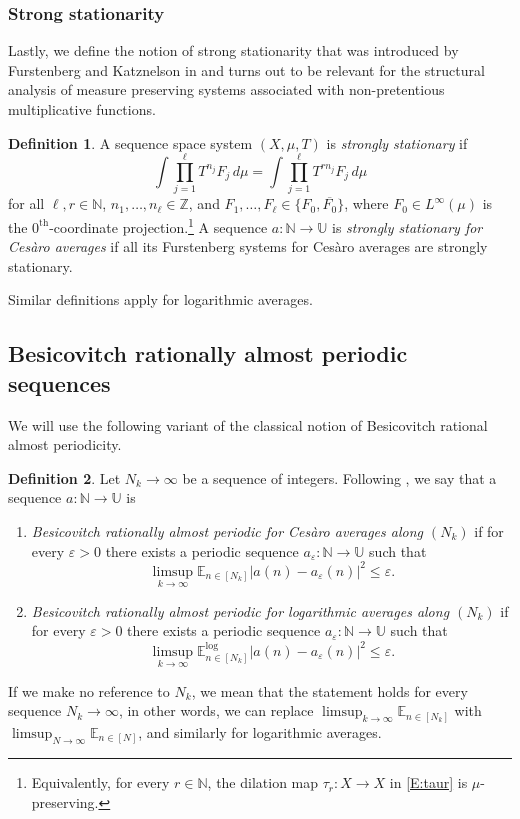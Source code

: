 \documentclass[11pt]{amsart}
\theoremstyle{definition}
\newtheorem{definition}{Definition}[section]
\newcommand{\lE}{\mathbb{E}^{\log}}
\newcommand{\E}{{\mathbb E}}
\newcommand{\N}{{\mathbb N}}
\newcommand{\Z}{{\mathbb Z}}
\newcommand{\U}{{\mathbb U}}
\begin{document}
\subsubsection{Strong stationarity}
Lastly, we define the notion of strong stationarity that was introduced by Furstenberg and Katznelson in \cite{FK91} and turns out to be relevant for  the structural analysis of measure preserving systems associated with  non-pretentious multiplicative functions. 		
\begin{definition}\label{D:sst}
	A sequence space system $(X,\mu,T)$ is {\em strongly stationary} if
	\begin{equation}\label{E:sst}
		\int \prod_{j=1}^\ell T^{n_j}F_j\, d\mu=	\int \prod_{j=1}^\ell T^{rn_j}F_j\, d\mu
	\end{equation}
	for all $\ell,r\in \N$, $n_1,\ldots, n_\ell\in \Z$,  and  $F_1,\ldots, F_\ell\in \{F_0,\overline{F_0}\}$,
	where $F_0\in L^\infty(\mu)$ is the $0^{\text{th}}$-coordinate projection.\footnote{Equivalently,    for every $r\in\N$, the dilation map $\tau_r\colon X\to X$ in \eqref{E:taur}  is $\mu$-preserving.}
	A sequence $a\colon \N\to \U$ is {\em strongly stationary for Ces\`aro averages}  if all its Furstenberg systems for Ces\`aro averages are strongly stationary.
	
	Similar definitions apply for logarithmic averages.
\end{definition}


 \subsection{Besicovitch rationally almost periodic sequences}\label{SS:Bes}
 We will use the following variant of the classical notion of Besicovitch rational almost periodicity.
 \begin{definition}\label{D:RAP}
 	Let $N_k\to \infty$ be a sequence of integers.	 Following \cite{BPLR19},	we say that a sequence $a\colon \N\to \U$ is
 	\begin{enumerate}
 		\item 	  {\em Besicovitch rationally almost periodic for Ces\`aro averages along $(N_k)$}  if for every $\varepsilon>0$ there exists a periodic sequence $a_\varepsilon\colon \N\to \U$   such that
 		$$
 		\limsup_{k\to\infty}\E_{n\in [N_k]}|a(n)-a_\varepsilon(n)|^2\leq \varepsilon.
 		$$
 		
 		
 		\item  {\em Besicovitch rationally almost periodic for logarithmic averages  along $(N_k)$}
 		if for every $\varepsilon>0$ there exists a periodic sequence $a_\varepsilon\colon \N\to \U$   such that
 		$$
 		\limsup_{k\to\infty}\lE_{n\in [N_k]}|a(n)-a_\varepsilon(n)|^2\leq \varepsilon.
 		$$
 	\end{enumerate}
 	If we make no reference to $N_k$, we mean that the statement holds for every sequence $N_k\to\infty$, in other words, we can replace 	$\limsup_{k\to\infty}\E_{n\in [N_k]}$ with
 	$\limsup_{N\to\infty}\E_{n\in [N]}$, and similarly for logarithmic averages.
 \end{definition}
\end{document}
